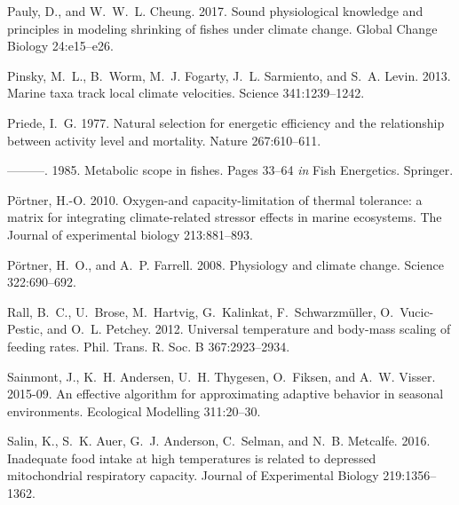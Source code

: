 \documentclass[11pt]{article}\usepackage[]{graphicx}\usepackage[]{color,soul}
\begin{document}
\begin{thebibliography}{62}
Pauly, D., and W.~W.~L. Cheung. 2017.
\newblock Sound physiological knowledge and principles in modeling shrinking of
  fishes under climate change.
\newblock Global Change Biology 24:e15--e26.

Pinsky, M.~L., B.~Worm, M.~J. Fogarty, J.~L. Sarmiento, and S.~A. Levin. 2013.
\newblock Marine taxa track local climate velocities.
\newblock Science 341:1239--1242.

Priede, I.~G. 1977.
\newblock Natural selection for energetic efficiency and the relationship
  between activity level and mortality.
\newblock Nature 267:610--611.

---{}---{}---. 1985.
\newblock Metabolic scope in fishes.
\newblock Pages 33--64 \emph{in} Fish Energetics. Springer.

P{\"o}rtner, H.-O. 2010.
\newblock Oxygen-and capacity-limitation of thermal tolerance: a matrix for
  integrating climate-related stressor effects in marine ecosystems.
\newblock The Journal of experimental biology 213:881--893.

P{\"o}rtner, H.~O., and A.~P. Farrell. 2008.
\newblock Physiology and climate change.
\newblock Science 322:690--692.

Rall, B.~C., U.~Brose, M.~Hartvig, G.~Kalinkat, F.~Schwarzmüller,
  O.~Vucic-Pestic, and O.~L. Petchey. 2012.
\newblock Universal temperature and body-mass scaling of feeding rates.
\newblock Phil. Trans. R. Soc. B 367:2923--2934.

Sainmont, J., K.~H. Andersen, U.~H. Thygesen, O.~Fiksen, and A.~W. Visser.
  2015-09.
\newblock An effective algorithm for approximating adaptive behavior in
  seasonal environments.
\newblock Ecological Modelling 311:20--30.

Salin, K., S.~K. Auer, G.~J. Anderson, C.~Selman, and N.~B. Metcalfe. 2016.
\newblock Inadequate food intake at high temperatures is related to depressed
  mitochondrial respiratory capacity.
\newblock Journal of Experimental Biology 219:1356--1362.


\end{thebibliography}
\end{document}
